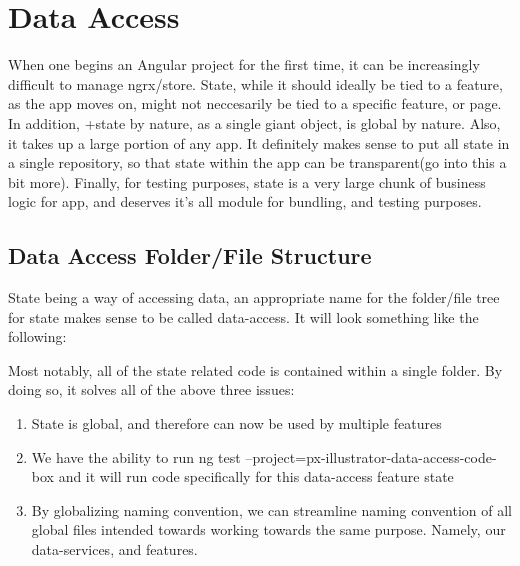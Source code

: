 \maketitle{}
\section{ Data Access }

When one begins an Angular project for the first time, it can be increasingly
difficult to manage ngrx/store. State, while it should ideally be tied to a
feature, as the app moves on, might not neccesarily be tied to a specific
feature, or page. In addition, +state by nature, as a single giant object,
is global by nature. Also, it takes up a large portion of any app. It definitely
makes sense to put all state in a single repository, so that state within the
app can be transparent(go into this a bit more). Finally, for testing purposes,
state is a very large chunk of business logic for app, and deserves it's all
module for bundling, and testing purposes.

\subsection{Data Access Folder/File Structure }
State being a way of accessing data, an appropriate name for the folder/file
tree for state makes sense to be called data-access. It will look something
like the following:



Most notably, all of the state related code is contained within a single
folder. By doing so, it solves all of the above three issues:
\begin{enumerate}
  \item State is global, and therefore can now be used by multiple features
  \item We have the ability to run
  ng test --project=px-illustrator-data-access-code-box and it will run code
  specifically for this data-access feature state
  \item By globalizing naming convention, we can streamline naming convention
  of all global files intended towards working towards the same purpose. Namely,
  our data-services, and features. 
\end{enumerate}
